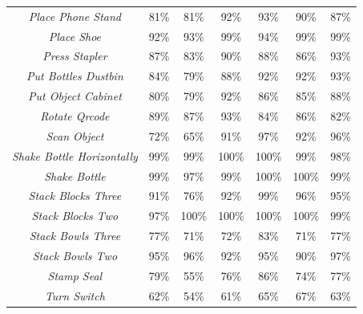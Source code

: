 \begin{table}[t]
\begin{tabular}{ccccccc}
    \textit{Place Phone Stand} & 81\%    & 81\%    & 92\%    & 93\%    & 90\%    & 87\% \\
    \textit{Place Shoe} & 92\%    & 93\%    & 99\%    & 94\%    & 99\%    & 99\% \\
    \textit{Press Stapler} & 87\%    & 83\%    & 90\%    & 88\%    & 86\%    & 93\% \\
    \textit{Put Bottles Dustbin} & 84\%    & 79\%    & 88\%    & 92\%    & 92\%    & 93\% \\
    \textit{Put Object Cabinet} & 80\%    & 79\%    & 92\%    & 86\%    & 85\%    & 88\% \\
    \textit{Rotate Qrcode} & 89\%    & 87\%    & 93\%    & 84\%    & 86\%    & 82\% \\
    \textit{Scan Object} & 72\%    & 65\%    & 91\%    & 97\%    & 92\%    & 96\% \\
    \textit{Shake Bottle Horizontally} & 99\%    & 99\%    & 100\%   & 100\%   & 99\%    & 98\% \\
    \textit{Shake Bottle} & 99\%    & 97\%    & 99\%    & 100\%   & 100\%   & 99\% \\
    \textit{Stack Blocks Three} & 91\%    & 76\%    & 92\%    & 99\%    & 96\%    & 95\% \\
    \textit{Stack Blocks Two} & 97\%    & 100\%   & 100\%   & 100\%   & 100\%   & 99\% \\
    \textit{Stack Bowls Three} & 77\%    & 71\%    & 72\%    & 83\%    & 71\%    & 77\% \\
    \textit{Stack Bowls Two} & 95\%    & 96\%    & 92\%    & 95\%    & 90\%    & 97\% \\
    \textit{Stamp Seal} & 79\%    & 55\%    & 76\%    & 86\%    & 74\%    & 77\% \\
    \textit{Turn Switch} & 62\%    & 54\%    & 61\%    & 65\%    & 67\%    & 63\% \\
    \bottomrule
    \end{tabular}
  \label{tab:robotwin}%
\end{table}%





